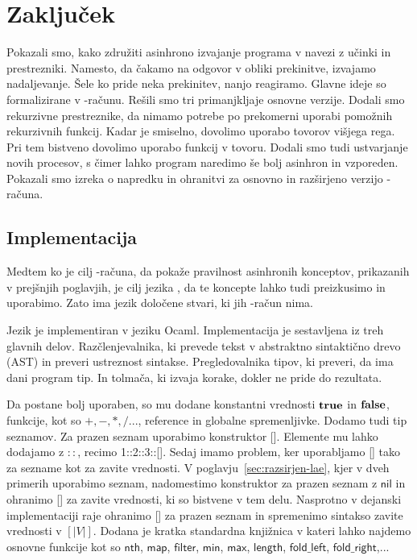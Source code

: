 \section{Zaključek}

Pokazali smo, kako združiti asinhrono izvajanje programa v navezi z učinki in prestrezniki.
Namesto, da čakamo na odgovor v obliki prekinitve, izvajamo nadaljevanje.
Šele ko pride neka prekinitev, nanjo reagiramo.
Glavne ideje so formalizirane v \lae-računu.
Rešili smo tri primanjkljaje osnovne verzije.
Dodali smo rekurzivne prestreznike, da nimamo potrebe po prekomerni uporabi pomožnih rekurzivnih funkcij.
Kadar je smiselno, dovolimo uporabo tovorov višjega rega.
Pri tem bistveno dovolimo uporabo funkcij v tovoru.
Dodali smo tudi ustvarjanje novih procesov, s čimer lahko program naredimo še bolj asinhron in vzporeden.
Pokazali smo izreka o napredku in ohranitvi za osnovno in razširjeno verzijo \lae-računa.

\subsection{Implementacija}\label{sec:implementacija}

Medtem ko je cilj \lae-računa, da pokaže pravilnost asinhronih konceptov, prikazanih v prejšnjih poglavjih, je cilj jezika \aeff{}, da te koncepte lahko tudi preizkusimo in uporabimo. Zato ima jezik \aeff{} določene stvari, ki jih \lae-račun nima.

Jezik \aeff{} je implementiran v jeziku Ocaml. Implementacija je sestavljena iz treh glavnih delov.
Razčlenjevalnika, ki prevede tekst v abstraktno sintaktično drevo (AST) in preveri ustreznost sintakse.  
Pregledovalnika tipov, ki preveri, da ima dani program tip.
In tolmača, ki izvaja korake, dokler ne pride do rezultata.


Da \aeff{} postane bolj uporaben, so mu dodane konstantni vrednosti $\mathbf{true}$ in $\mathbf{false}$, funkcije, kot so $+, -, *, / ...$, reference in globalne spremenljivke.
Dodamo tudi tip seznamov. Za prazen seznam uporabimo konstruktor []. Elemente mu lahko dodajamo z $::$, recimo 1::2::3::[].
Sedaj imamo problem, ker uporabljamo [] tako za sezname kot za zavite vrednosti.
V poglavju~\ref{sec:razsirjen-lae}, kjer v dveh primerih uporabimo seznam, nadomestimo konstruktor za prazen seznam z $\mathsf{nil}$ in ohranimo [] za zavite vrednosti, ki so bistvene v tem delu.
Nasprotno v dejanski implementaciji \aeff{} raje ohranimo [] za prazen seznam in spremenimo sintakso zavite vrednosti v $[|V|]$. 
Dodana je kratka standardna knjižnica v kateri lahko najdemo osnovne funkcije kot so $\mathsf{nth}$, $\mathsf{map}$, $\mathsf{filter}$, $\mathsf{min}$, $\mathsf{max}$, $\mathsf{length}$, $\mathsf{fold\_left}$, $\mathsf{fold\_right}$,...

